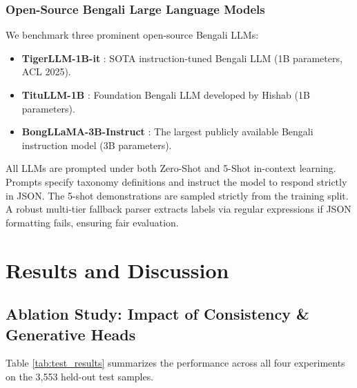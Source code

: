 \documentclass[conference]{IEEEtran}
\begin{document}
\subsubsection{Open-Source Bengali Large Language Models}
We benchmark three prominent open-source Bengali LLMs:
\begin{itemize}
    \item \textbf{TigerLLM-1B-it} \cite{nishat2025tigerllm, raihan2025tigerllm}: SOTA instruction-tuned Bengali LLM (1B parameters, ACL 2025).
    \item \textbf{TituLLM-1B} \cite{hishab2024titullm}: Foundation Bengali LLM developed by Hishab (1B parameters).
    \item \textbf{BongLLaMA-3B-Instruct} \cite{banglallm2024bongllama}: The largest publicly available Bengali instruction model (3B parameters).
\end{itemize}
All LLMs are prompted under both Zero-Shot and 5-Shot in-context learning. Prompts specify taxonomy definitions and instruct the model to respond strictly in JSON. The 5-shot demonstrations are sampled strictly from the training split. A robust multi-tier fallback parser extracts labels via regular expressions if JSON formatting fails, ensuring fair evaluation.

\section{Results and Discussion}
\label{sec:results}

\subsection{Ablation Study: Impact of Consistency \& Generative Heads}
Table \ref{tab:test_results} summarizes the performance across all four experiments on the 3,553 held-out test samples.

\begin{table}[t]
\caption{Test Set Performance (Macro F1) and Consistency Violation Rate on 3,553 Held-Out Samples}
\label{tab:test_results}
\begin{center}
\end{center}
\end{table}
\end{document}
